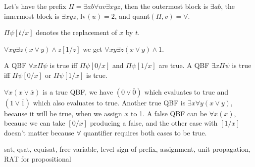 \begin{example}
    Let's have the prefix $\Pi = \exists ab \forall uv \exists xyz$, then the outermost block is $\exists ab$, the innermost block is $\exists xyz$, lv$(u) = 2$, and quant$(\Pi, v) = \forall$.
\end{example}

\begin{definition}
    $\Pi\psi[t/x]$ denotes the replacement of $x$ by $t$.
\end{definition}

\begin{example}
    $\forall xy \exists z (x \lor y) \land z[1/z]$ we get $\forall xy \exists z (x \lor y) \land 1$.
\end{example}

\begin{definition}\label{def:semantics}
    A QBF $\forall x \Pi \psi$ is true iff $\Pi \psi[0/x]$ and $\Pi \psi[1/x]$ are true. A QBF $\exists x \Pi \psi$ is true iff $\Pi \psi[0/x]$ or $\Pi \psi[1/x]$ is true.
\end{definition}

\begin{example}
    $\forall x (x \lor \overline{x})$ is a true QBF, we have $(0 \lor \overline{0})$ which evaluates to true and $(1 \lor \overline{1})$ which also evaluates to true. Another true QBF is $\exists x \forall y (x \lor y)$, because it will be true, when we assign $x$ to 1. A false QBF can be $\forall x (x)$, because we can take $[0/x]$ producing a false, and the other case with $[1/x]$ doesn't matter because $\forall$ quantifier requires both cases to be true.
\end{example}

\begin{definition}
\end{definition}

sat, qsat, equisat, free variable, level sign of prefix, assignment, unit propagation, RAT for propositional